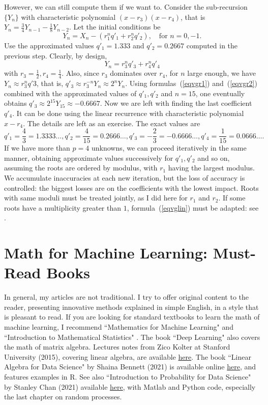 \documentclass[oneside,10pt]{book}
\begin{document}
However, we can still compute them if we want to. Consider the sub-recursion $\{Y_n\}$ with characteristic polynomial $(x-r_3)(x-r_4)$, that is $Y_n=\frac{3}{4}Y_{n-1}-\frac{1}{8}Y_{n-2}$. Let the initial conditions be
\begin{equation}\label{eqvgr1}
Y_n=X_n - (r_1^n q'_1 + r_2^n q'_2), \quad \text{for } n=0,-1.
\end{equation}
 Use the approximated values $q'_1=1.333$ and $q'_2=0.2667$ computed in the previous step. Clearly, by design,
\begin{equation}\label{eqvgr2}
Y_n=r_3^n q'_3 + r_4^n q'_4
\end{equation}
with $r_3=\frac{1}{2},r_4=\frac{1}{4}$. Also, since $r_3$ dominates over $r_4$, for $n$ large enough, we have $Y_n\approx r_3^n q'3$, that is,
$q'_3\approx r_3^{-n}Y_n \approx 2^n Y_n$. Using formulas~(\ref{eqvgr1}) and~(\ref{eqvgr2}) combined with the approximated values of $q'_1, q'_2$
 and $n=15$, one
eventually obtains $q'_3\approx 2^{15}Y_{15} \approx -0.6667$. Now we are left with finding the last coefficient $q'_4$. It can be done using the linear recurrence with characteristic polynomial $x-r_4$. The details are left as an exercise. The exact values are
$$q'_1=\frac{4}{3}=1.3333\dots, q'_2=\frac{4}{15}=0.2666\dots, q'_3=-\frac{2}{3}=-0.6666\dots, q'_4=\frac{1}{15}=0.0666\dots. $$
If we have more than $p=4$ unknowns, we can proceed iteratively in the same manner, obtaining approximate values successively for $q'_1,q'_2$ and so on, assuming the roots are ordered by modulus, with $r_1$ having the largest modulus.  We accumulate inaccuracies at each new iteration, but the loss of accuracy is controlled:
 the biggest losses are on the coefficients with the lowest impact. Roots with same moduli must be treated jointly, as I did here for $r_1$ and $r_2$. If some roots have a multiplicity greater than $1$, formula~(\ref{eqvglin}) must be adapted: see \cite{arashfa}.

\section{Math for Machine Learning: Must-Read Books}

In general, my articles are not traditional. I try to offer original content to the reader, presenting innovative methods explained in simple English, in
a style that is pleasant to read.
If you are looking for standard textbooks to learn the math of machine learning, I recommend ``Mathematics for Machine Learning" \cite{faisal2020}
and ``Introduction to Mathematical Statistics" \cite{hogg2019}. The book ``Deep Learning" \cite{goodfellow2016} also covers the math of matrix algebra. Lectures notes from Zico Kolter at Stanford University (2015), covering linear algebra, are available \href{https://cs229.stanford.edu/section/cs229-linalg.pdf}{here}. The book ``Linear Algebra for Data Science" by Shaina Bennett (2021) is available online \href{https://shainarace.github.io/LinearAlgebra/}{here},
and features examples in R. See also ``Introduction to Probability for Data Science" by Stanley Chan (2021) available \href{https://probability4datascience.com/}{here}, with Matlab and Python code, especially the last chapter on random processes.
\end{document}
